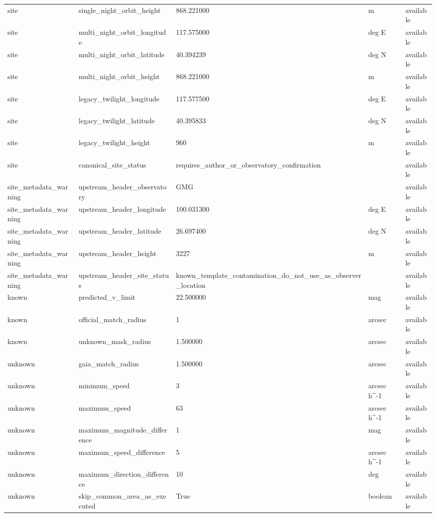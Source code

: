 \begin{tabular}{lllll}
site & single\_night\_orbit\_height & 868.221000 & m & available \\
site & multi\_night\_orbit\_longitude & 117.575000 & deg E & available \\
site & multi\_night\_orbit\_latitude & 40.394239 & deg N & available \\
site & multi\_night\_orbit\_height & 868.221000 & m & available \\
site & legacy\_twilight\_longitude & 117.577500 & deg E & available \\
site & legacy\_twilight\_latitude & 40.395833 & deg N & available \\
site & legacy\_twilight\_height & 960 & m & available \\
site & canonical\_site\_status & requires\_author\_or\_observatory\_confirmation &  & available \\
site\_metadata\_warning & upstream\_header\_observatory & GMG &  & available \\
site\_metadata\_warning & upstream\_header\_longitude & 100.031300 & deg E & available \\
site\_metadata\_warning & upstream\_header\_latitude & 26.697400 & deg N & available \\
site\_metadata\_warning & upstream\_header\_height & 3227 & m & available \\
site\_metadata\_warning & upstream\_header\_site\_status & known\_template\_contamination\_do\_not\_use\_as\_observer\_location &  & available \\
known & predicted\_v\_limit & 22.500000 & mag & available \\
known & official\_match\_radius & 1 & arcsec & available \\
known & unknown\_mask\_radius & 1.500000 & arcsec & available \\
unknown & gaia\_match\_radius & 1.500000 & arcsec & available \\
unknown & minimum\_speed & 3 & arcsec h\textasciicircum -1 & available \\
unknown & maximum\_speed & 63 & arcsec h\textasciicircum -1 & available \\
unknown & maximum\_magnitude\_difference & 1 & mag & available \\
unknown & maximum\_speed\_difference & 5 & arcsec h\textasciicircum -1 & available \\
unknown & maximum\_direction\_difference & 10 & deg & available \\
unknown & skip\_common\_area\_as\_executed & True & boolean & available \\

\end{tabular}
